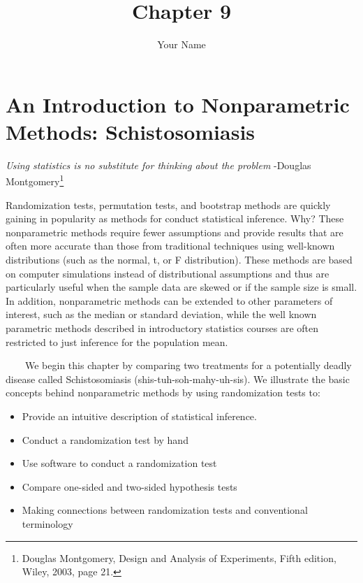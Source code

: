 \documentclass[
]{report}
\title{Chapter 9}
\author{Your Name}
\date{}
\providecommand{\tightlist}{%
  \setlength{\itemsep}{0pt}\setlength{\parskip}{0pt}}
\begin{document}
\maketitle

{
\setcounter{tocdepth}{1}
\tableofcontents
}
\chapter{An Introduction to Nonparametric Methods: Schistosomiasis}\label{an-introduction-to-nonparametric-methods-schistosomiasis}

\emph{Using statistics is no substitute for thinking about the problem}
-Douglas Montgomery\footnote{Douglas Montgomery, Design and Analysis of Experiments, Fifth edition, Wiley, 2003, page 21.}

Randomization tests, permutation tests, and bootstrap methods are quickly gaining in popularity as methods for conduct statistical inference. Why? These nonparametric methods require fewer assumptions and provide results that are often more accurate than those from traditional techniques using well-known distributions (such as the normal, t, or F distribution). These methods are based on computer simulations instead of distributional assumptions and thus are particularly useful when the sample data are skewed or if the sample size is small. In addition, nonparametric methods can be extended to other parameters of interest, such as the median or standard deviation, while the well known parametric methods described in introductory statistics courses are often restricted to just inference for the population mean.

~~~~We begin this chapter by comparing two treatments for a potentially deadly disease called Schistosomiasis (shis-tuh-soh-mahy-uh-sis). We illustrate the basic concepts behind nonparametric methods by using randomization tests to:

\begin{itemize}
\tightlist
\item
  Provide an intuitive description of statistical inference.
\item
  Conduct a randomization test by hand
\item
  Use software to conduct a randomization test
\item
  Compare one-sided and two-sided hypothesis tests
\item
  Making connections between randomization tests and conventional terminology
\end{itemize}
\end{document}
